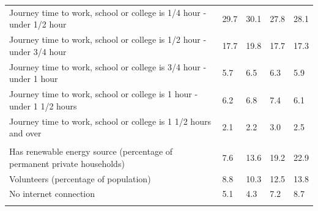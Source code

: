 \documentclass{article}
\begin{document}
\begin{table}[h]
\begin{tabular}{KTTTT}
Journey time to work, school or college is 1/4 hour - under 1/2 hour & 29.7& 30.1& 27.8& 28.1\\
Journey time to work, school or college is 1/2 hour - under 3/4 hour & 17.7& 19.8& 17.7& 17.3\\
Journey time to work, school or college is 3/4 hour - under 1 hour & 5.7& 6.5& 6.3& 5.9\\
Journey time to work, school or college is 1 hour - under 1 1/2 hours & 6.2& 6.8& 7.4& 6.1\\
Journey time to work, school or college is 1 1/2 hours and over & 2.1& 2.2& 3.0& 2.5\\
\hline
    \\ 
    \hline
Has renewable energy source (percentage of permanent private households) &  7.6& 13.6& 19.2& 22.9\\
    \hline
Volunteers (percentage of population) &  8.8& 10.3& 12.5& 13.8\\
    \hline
No internet connection& 5.1& 4.3& 7.2& 8.7\\
\hline
\end{tabular}
\end{table}
\end{document}
